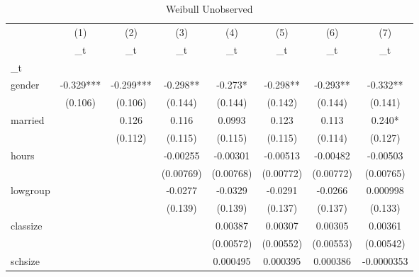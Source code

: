 \begin{table}[htbp]\centering
\def\sym#1{\ifmmode^{#1}\else\(^{#1}\)\fi}
\caption{Weibull Unobserved}
\begin{tabular}{l*{7}{c}}
\hline\hline
            &\multicolumn{1}{c}{(1)}&\multicolumn{1}{c}{(2)}&\multicolumn{1}{c}{(3)}&\multicolumn{1}{c}{(4)}&\multicolumn{1}{c}{(5)}&\multicolumn{1}{c}{(6)}&\multicolumn{1}{c}{(7)}\\
            &\multicolumn{1}{c}{\_t}&\multicolumn{1}{c}{\_t}&\multicolumn{1}{c}{\_t}&\multicolumn{1}{c}{\_t}&\multicolumn{1}{c}{\_t}&\multicolumn{1}{c}{\_t}&\multicolumn{1}{c}{\_t}\\
\hline
\_t          &               &               &               &               &               &               &               \\
gender      &      -0.329***&      -0.299***&      -0.298** &      -0.273*  &      -0.298** &      -0.293** &      -0.332** \\
            &     (0.106)   &     (0.106)   &     (0.144)   &     (0.144)   &     (0.142)   &     (0.144)   &     (0.141)   \\
[1em]
married     &               &       0.126   &       0.116   &      0.0993   &       0.123   &       0.113   &       0.240*  \\
            &               &     (0.112)   &     (0.115)   &     (0.115)   &     (0.115)   &     (0.114)   &     (0.127)   \\
[1em]
hours       &               &               &    -0.00255   &    -0.00301   &    -0.00513   &    -0.00482   &    -0.00503   \\
            &               &               &   (0.00769)   &   (0.00768)   &   (0.00772)   &   (0.00772)   &   (0.00765)   \\
[1em]
lowgroup    &               &               &     -0.0277   &     -0.0329   &     -0.0291   &     -0.0266   &    0.000998   \\
            &               &               &     (0.139)   &     (0.139)   &     (0.137)   &     (0.137)   &     (0.133)   \\
[1em]
classize    &               &               &               &     0.00387   &     0.00307   &     0.00305   &     0.00361   \\
            &               &               &               &   (0.00572)   &   (0.00552)   &   (0.00553)   &   (0.00542)   \\
[1em]
schsize     &               &               &               &    0.000495   &    0.000395   &    0.000386   &  -0.0000353   \\

\end{tabular}
\end{table}
